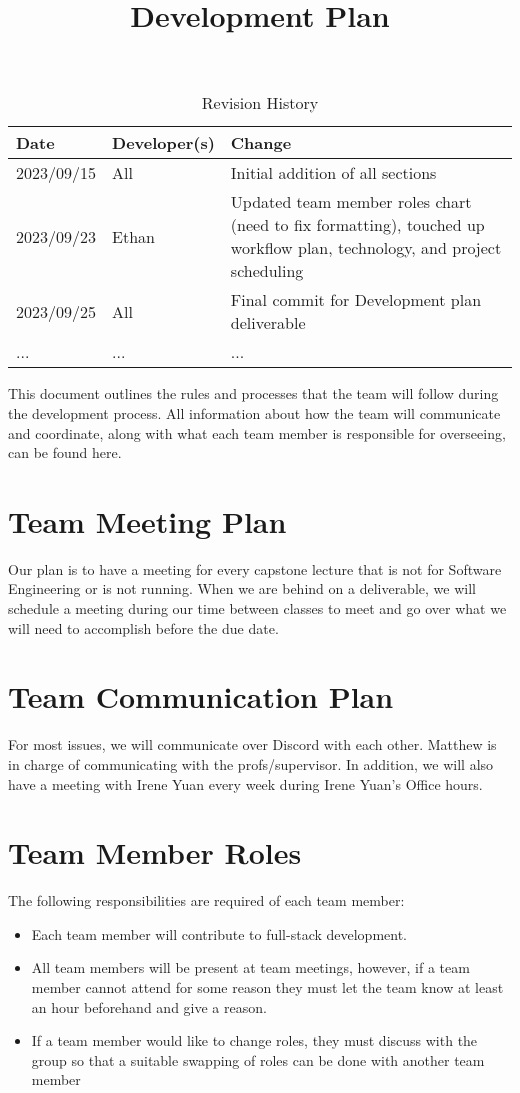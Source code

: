 \documentclass{article}
\title{Development Plan\\\progname}
\author{\authname}
\date{}
\begin{document}
\maketitle

\begin{table}[hp]
\caption{Revision History} \label{TblRevisionHistory}
\begin{tabularx}{\textwidth}{llX}
\toprule
\textbf{Date} & \textbf{Developer(s)} & \textbf{Change}\\
\midrule
2023/09/15 & All & Initial addition of all sections\\
2023/09/23 & Ethan & Updated team member roles chart (need to fix formatting), touched up workflow plan, technology, and project scheduling  \\
2023/09/25 & All & Final commit for Development plan deliverable\\
... & ... & ...\\

\bottomrule
\end{tabularx}
\end{table}

This document outlines the rules and processes that the team will follow during the development process. All information about how the team will communicate and coordinate, along with what each team member is responsible for overseeing, can be found here.

\section{Team Meeting Plan}

Our plan is to have a meeting for every capstone lecture that is not for Software Engineering or is not running. When we are behind on a deliverable, we will schedule a meeting during our time between classes to meet and go over what we will need to accomplish before the due date.

\section{Team Communication Plan}
For most issues, we will communicate over Discord with each other. Matthew is in charge of communicating with the profs/supervisor. In addition, we will also have a meeting with Irene Yuan every week during Irene Yuan's Office hours. 
\newpage
\section{Team Member Roles}
The following responsibilities are required of each team member:
\begin{itemize}
    \item Each team member will contribute to full-stack development.
    \item All team members will be present at team meetings, however, if a team member cannot attend for some reason they must let the team know at least an hour beforehand and give a reason.
    \item If a team member would like to change roles, they must discuss with the group so that a suitable swapping of roles can be done with another team member
\end{itemize}
\end{document}
